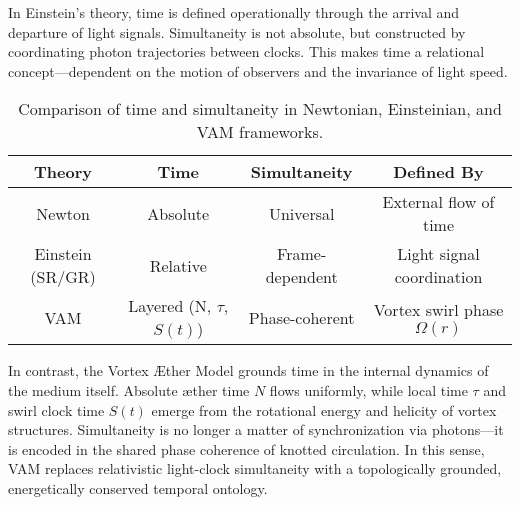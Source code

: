 \documentclass[preprint]{revtex4-2}
\begin{document}
    In Einstein’s theory, time is defined operationally through the arrival and departure of light signals. Simultaneity is not absolute, but constructed by coordinating photon trajectories between clocks. This makes time a relational concept—dependent on the motion of observers and the invariance of light speed.

    \begin{table}[h!]
        \centering
        \begin{tabular}{|c|c|c|c|}
            \hline
            \textbf{Theory} & \textbf{Time} & \textbf{Simultaneity} & \textbf{Defined By} \\
            \hline
            Newton & Absolute & Universal & External flow of time \\
            Einstein (SR/GR) & Relative & Frame-dependent & Light signal coordination \\
            VAM & Layered (N, $\tau$, $S(t)$) & Phase-coherent & Vortex swirl phase $\Omega(r)$ \\
            \hline
        \end{tabular}
        \caption{Comparison of time and simultaneity in Newtonian, Einsteinian, and VAM frameworks.}
    \end{table}

    In contrast, the Vortex Æther Model grounds time in the internal dynamics of the medium itself. Absolute æther time \( N \) flows uniformly, while local time \( \tau \) and swirl clock time \( S(t) \) emerge from the rotational energy and helicity of vortex structures. Simultaneity is no longer a matter of synchronization via photons—it is encoded in the shared phase coherence of knotted circulation. In this sense, VAM replaces relativistic light-clock simultaneity with a topologically grounded, energetically conserved temporal ontology.
\end{document}
